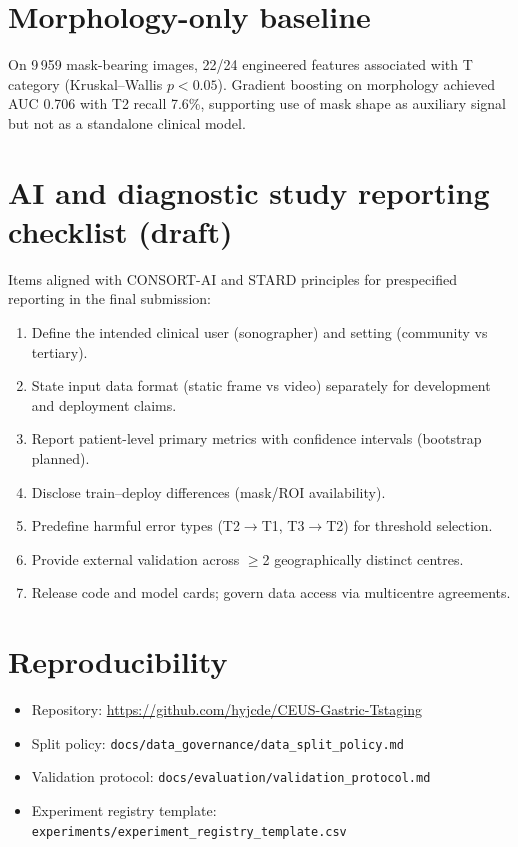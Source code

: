 \documentclass[11pt,a4paper]{article}
\begin{document}
\section{Morphology-only baseline}
On 9\,959 mask-bearing images, 22/24 engineered features associated with T category (Kruskal--Wallis $p<0.05$). Gradient boosting on morphology achieved AUC 0.706 with T2 recall 7.6\%, supporting use of mask shape as auxiliary signal but not as a standalone clinical model.

\section{AI and diagnostic study reporting checklist (draft)}
Items aligned with CONSORT-AI and STARD principles for prespecified reporting in the final submission:
\begin{enumerate}
  \item Define the intended clinical user (sonographer) and setting (community vs tertiary).
  \item State input data format (static frame vs video) separately for development and deployment claims.
  \item Report patient-level primary metrics with confidence intervals (bootstrap planned).
  \item Disclose train--deploy differences (mask/ROI availability).
  \item Predefine harmful error types (T2$\rightarrow$T1, T3$\rightarrow$T2) for threshold selection.
  \item Provide external validation across $\geq$2 geographically distinct centres.
  \item Release code and model cards; govern data access via multicentre agreements.
\end{enumerate}

\section{Reproducibility}
\begin{itemize}
  \item Repository: \url{https://github.com/hyjcde/CEUS-Gastric-Tstaging}
  \item Split policy: \texttt{docs/data\_governance/data\_split\_policy.md}
  \item Validation protocol: \texttt{docs/evaluation/validation\_protocol.md}
  \item Experiment registry template: \texttt{experiments/experiment\_registry\_template.csv}
\end{itemize}
\end{document}
